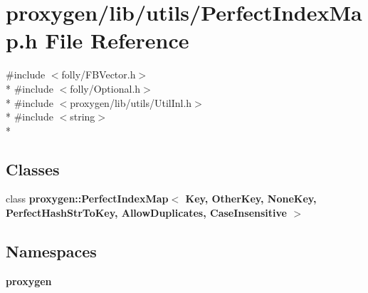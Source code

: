 \section{proxygen/lib/utils/\+Perfect\+Index\+Map.h File Reference}
\label{PerfectIndexMap_8h}
{\ttfamily \#include $<$folly/\+F\+B\+Vector.\+h$>$}\\*
{\ttfamily \#include $<$folly/\+Optional.\+h$>$}\\*
{\ttfamily \#include $<$proxygen/lib/utils/\+Util\+Inl.\+h$>$}\\*
{\ttfamily \#include $<$string$>$}\\*
\subsection*{Classes}
\begin{DoxyCompactItemize}
\item 
class {\bf proxygen\+::\+Perfect\+Index\+Map$<$ Key, Other\+Key, None\+Key, Perfect\+Hash\+Str\+To\+Key, Allow\+Duplicates, Case\+Insensitive $>$}
\end{DoxyCompactItemize}
\subsection*{Namespaces}
\begin{DoxyCompactItemize}
\item 
 {\bf proxygen}
\end{DoxyCompactItemize}

